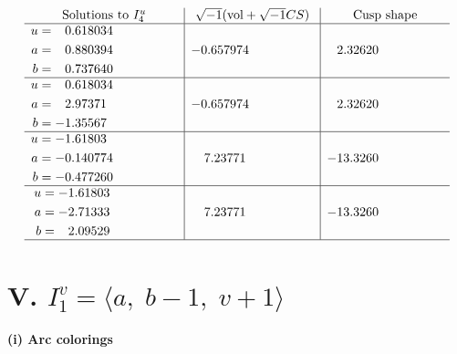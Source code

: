 \documentclass[1p]{elsarticle_modified}
\theoremstyle{definition}
\newcommand{\I}{\sqrt{-1}}
\begin{document}
$$\begin{array}{c|c|c}  
\text{Solutions to }I^u_{4}& \I (\text{vol} + \sqrt{-1}CS) & \text{Cusp shape}\\
 \hline 
\begin{aligned}
u &= \phantom{-}0.618034\phantom{ +0.000000I} \\
a &= \phantom{-}0.880394\phantom{ +0.000000I} \\
b &= \phantom{-}0.737640\phantom{ +0.000000I}\end{aligned}
 & -0.657974\phantom{ +0.000000I} & \phantom{-}2.32620\phantom{ +0.000000I} \\ \hline\begin{aligned}
u &= \phantom{-}0.618034\phantom{ +0.000000I} \\
a &= \phantom{-}2.97371\phantom{ +0.000000I} \\
b &= -1.35567\phantom{ +0.000000I}\end{aligned}
 & -0.657974\phantom{ +0.000000I} & \phantom{-}2.32620\phantom{ +0.000000I} \\ \hline\begin{aligned}
u &= -1.61803\phantom{ +0.000000I} \\
a &= -0.140774\phantom{ +0.000000I} \\
b &= -0.477260\phantom{ +0.000000I}\end{aligned}
 & \phantom{-}7.23771\phantom{ +0.000000I} & -13.3260\phantom{ +0.000000I} \\ \hline\begin{aligned}
u &= -1.61803\phantom{ +0.000000I} \\
a &= -2.71333\phantom{ +0.000000I} \\
b &= \phantom{-}2.09529\phantom{ +0.000000I}\end{aligned}
 & \phantom{-}7.23771\phantom{ +0.000000I} & -13.3260\phantom{ +0.000000I}\\
 \hline 
 \end{array}$$\newpage\newpage\renewcommand{\arraystretch}{1}
\centering \section*{V. $I^v_{1}= \langle a,\;b-1,\;v+1 \rangle$}
\flushleft \textbf{(i) Arc colorings}\\
\end{document}
